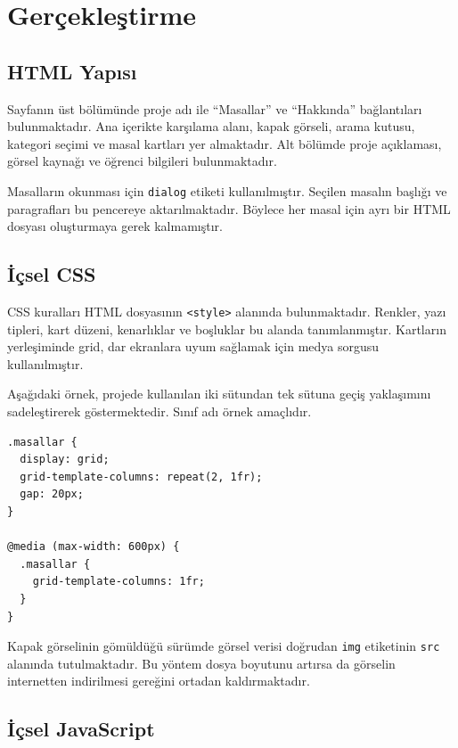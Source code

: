 \documentclass[12pt,a4paper]{article}
\begin{document}
\clearpage

\section{Gerçekleştirme}

\subsection{HTML Yapısı}

Sayfanın üst bölümünde proje adı ile ``Masallar''
ve ``Hakkında'' bağlantıları bulunmaktadır.
Ana içerikte karşılama alanı, kapak görseli,
arama kutusu, kategori seçimi ve masal kartları
yer almaktadır. Alt bölümde proje açıklaması,
görsel kaynağı ve öğrenci bilgileri bulunmaktadır.

Masalların okunması için \texttt{dialog} etiketi
kullanılmıştır. Seçilen masalın başlığı ve
paragrafları bu pencereye aktarılmaktadır.
Böylece her masal için ayrı bir HTML dosyası
oluşturmaya gerek kalmamıştır.

\subsection{İçsel CSS}

CSS kuralları HTML dosyasının \texttt{<style>}
alanında bulunmaktadır. Renkler, yazı tipleri,
kart düzeni, kenarlıklar ve boşluklar bu alanda
tanımlanmıştır. Kartların yerleşiminde grid,
dar ekranlara uyum sağlamak için medya
sorgusu kullanılmıştır.

Aşağıdaki örnek, projede kullanılan iki sütundan
tek sütuna geçiş yaklaşımını sadeleştirerek
göstermektedir. Sınıf adı örnek amaçlıdır.

\begin{lstlisting}[caption={Duyarlı kart düzeninin sadeleştirilmiş örneği}]
.masallar {
  display: grid;
  grid-template-columns: repeat(2, 1fr);
  gap: 20px;
}

@media (max-width: 600px) {
  .masallar {
    grid-template-columns: 1fr;
  }
}
\end{lstlisting}

Kapak görselinin gömüldüğü sürümde görsel verisi
doğrudan \texttt{img} etiketinin \texttt{src}
alanında tutulmaktadır. Bu yöntem dosya boyutunu
artırsa da görselin internetten indirilmesi
gereğini ortadan kaldırmaktadır.

\subsection{İçsel JavaScript}
\end{document}
